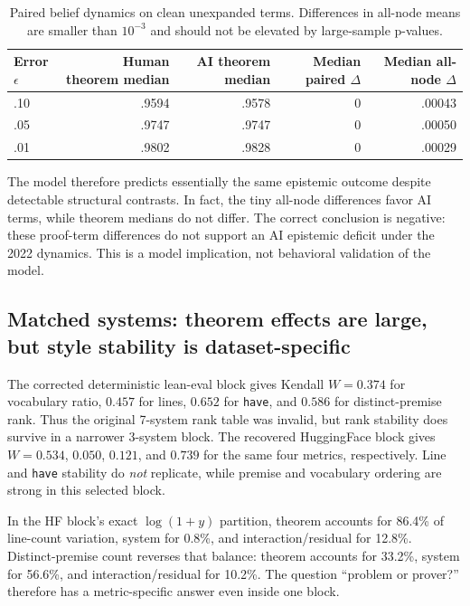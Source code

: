 \documentclass[11pt]{article}
\newcommand{\code}[1]{\texttt{#1}}
\begin{document}
\begin{table}[!htbp]
\centering
\caption{Paired belief dynamics on clean unexpanded terms.  Differences in all-node means are
smaller than $10^{-3}$ and should not be elevated by large-sample p-values.}
\label{tab:belief}
\small
\begin{tabular}{lrrrr}
\toprule
Error $\epsilon$ & Human theorem median & AI theorem median & Median paired $\Delta$ &
Median all-node $\Delta$ \\
\midrule
.10 & .9594 & .9578 & 0 & .00043 \\
.05 & .9747 & .9747 & 0 & .00050 \\
.01 & .9802 & .9828 & 0 & .00029 \\
\bottomrule
\end{tabular}
\end{table}

The model therefore predicts essentially the same epistemic outcome despite detectable structural
contrasts.  In fact, the tiny all-node differences favor AI terms, while theorem medians do not
differ.  The correct conclusion is negative: these proof-term differences do not support an AI
epistemic deficit under the 2022 dynamics.  This is a model implication, not behavioral validation
of the model.

\subsection{Matched systems: theorem effects are large, but style stability is dataset-specific}

The corrected deterministic lean-eval block gives Kendall $W=0.374$ for vocabulary ratio, $0.457$
for lines, $0.652$ for \code{have}, and $0.586$ for distinct-premise rank.  Thus the original
7-system rank
table was invalid, but rank stability does survive in a narrower 3-system block.  The recovered
HuggingFace block gives $W=0.534$, $0.050$, $0.121$, and $0.739$ for the same four
metrics, respectively.  Line and \code{have} stability do \emph{not} replicate, while premise and
vocabulary ordering are strong in this selected block.

In the HF block's exact $\log(1+y)$ partition, theorem accounts for 86.4\% of line-count variation,
system for 0.8\%, and interaction/residual for 12.8\%.  Distinct-premise count reverses that
balance: theorem accounts for 33.2\%, system for 56.6\%, and interaction/residual for 10.2\%.
The question ``problem or prover?'' therefore has a metric-specific answer even inside one block.
\end{document}
